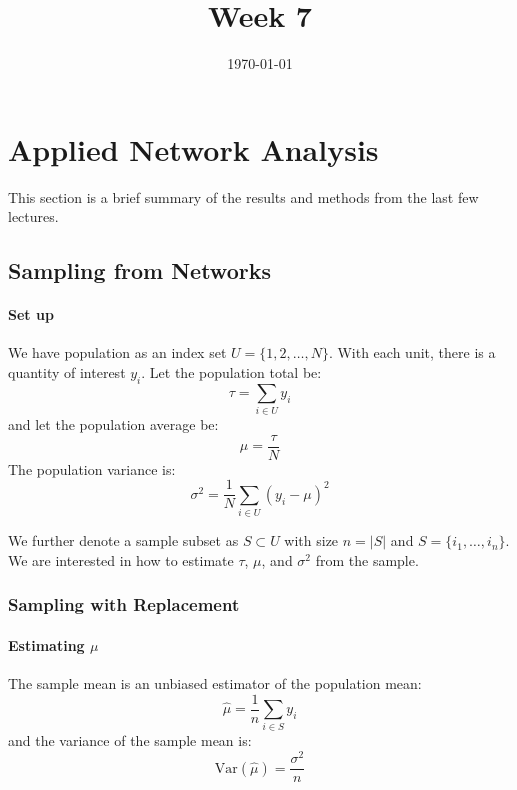 \documentclass{article}
\title{Week 7}
\date{\today}
\begin{document}
\maketitle
\section{Applied Network Analysis}
This section is a brief summary of the results and methods from the last few lectures.

\subsection{Sampling from Networks}
\paragraph{Set up} We have population as an index set $U=\{1,2,\ldots, N\}$. With each unit, there is a quantity of interest $y_i$. Let the population total be:
\begin{equation*}
    \tau = \sum_{i\in U} y_i
\end{equation*}
and let the population average be:
\begin{equation*}
    \mu = \frac{\tau}{N}
\end{equation*}
The population variance is:
\begin{equation*}
    \sigma^2 = \frac{1}{N}\sum_{i\in U} (y_i-\mu)^2
\end{equation*}

We further denote a sample subset as $S\subset U$ with size $n=|S|$ and $S=\{i_1, \ldots, i_n\}$. We are interested in how to estimate $\tau$,  $\mu$, and $\sigma^2$ from the sample.

\subsubsection{Sampling with Replacement}

\paragraph{Estimating $\mu$} The sample mean is an unbiased estimator of the population mean: 
\begin{equation*}
    \hat{\mu} = \frac{1}{n}\sum_{i\in S} y_i
\end{equation*}
and the variance of the sample mean is:
\begin{equation*}
    \mathrm{Var}(\hat{\mu}) = \frac{\sigma^2}{n}
\end{equation*}
\end{document}
